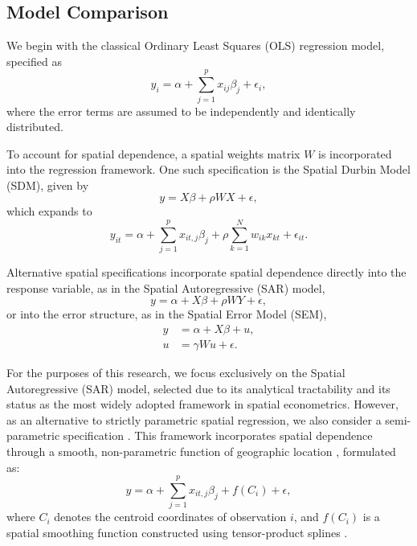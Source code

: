 

\subsection{Model Comparison}

We begin with the classical Ordinary Least Squares (OLS) regression model,
specified as
\begin{equation}
	y_i = \alpha + \sum_{j=1}^{p} x_{ij}\beta_j + \epsilon_i,
\end{equation}
where the error terms are assumed to be independently and identically
distributed.

To account for spatial dependence, a spatial weights matrix $W$ is incorporated
into the regression framework. One such specification is the Spatial Durbin
Model (SDM), given by
\begin{equation}
	y = X\beta + \rho WX + \epsilon,
\end{equation}
which expands to
\begin{equation}
	y_{it}
	=
	\alpha
	+ \sum_{j=1}^{p} x_{it,j}\beta_j
	+ \rho \sum_{k=1}^{N} w_{ik} x_{kt}
	+ \epsilon_{it}.
\end{equation}

Alternative spatial specifications incorporate spatial dependence directly into
the response variable, as in the Spatial Autoregressive (SAR) model,
\begin{equation}
	y = \alpha + X\beta + \rho WY + \epsilon,
	\label{eq:SAR}
\end{equation}
or into the error structure, as in the Spatial Error Model (SEM),
\begin{equation}
	\begin{split}
		y & = \alpha + X\beta + u,  \\
		u & = \gamma Wu + \epsilon.
	\end{split}
\end{equation}

For the purposes of this research, we focus exclusively on the Spatial Autoregressive (SAR) model,
selected due to its analytical tractability and its status as the most widely adopted framework in
spatial econometrics. However, as an alternative to strictly parametric spatial regression, we
also consider a semi-parametric specification \cite{macnab2001autoregressive}. This framework incorporates spatial dependence
through a smooth, non-parametric function of geographic location , formulated as:
\begin{equation}
	y = \alpha + \sum_{j=1}^{p} x_{it,j}\beta_j + f(C_i) + \epsilon,
	\label{eq:tensor}
\end{equation}
where $C_i$ denotes the centroid coordinates of observation $i$, and
$f(C_i)$ is a spatial smoothing function constructed using tensor-product
splines \cite{wood2003thin}.

